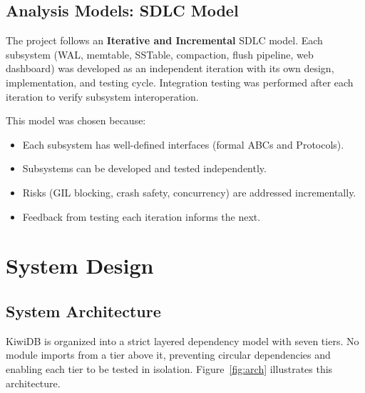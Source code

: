 \documentclass[oneside,a4paper,12pt]{book}
\begin{document}
\section{Analysis Models: SDLC Model}

The project follows an \textbf{Iterative and Incremental} SDLC model. Each subsystem (WAL, memtable, SSTable, compaction, flush pipeline, web dashboard) was developed as an independent iteration with its own design, implementation, and testing cycle. Integration testing was performed after each iteration to verify subsystem interoperation.

This model was chosen because:
\begin{itemize}[leftmargin=2em]
    \item Each subsystem has well-defined interfaces (formal ABCs and Protocols).
    \item Subsystems can be developed and tested independently.
    \item Risks (GIL blocking, crash safety, concurrency) are addressed incrementally.
    \item Feedback from testing each iteration informs the next.
\end{itemize}


\chapter{System Design}

\section{System Architecture}

KiwiDB is organized into a strict layered dependency model with seven tiers. No module imports from a tier above it, preventing circular dependencies and enabling each tier to be tested in isolation. Figure~\ref{fig:arch} illustrates this architecture.
\end{document}
